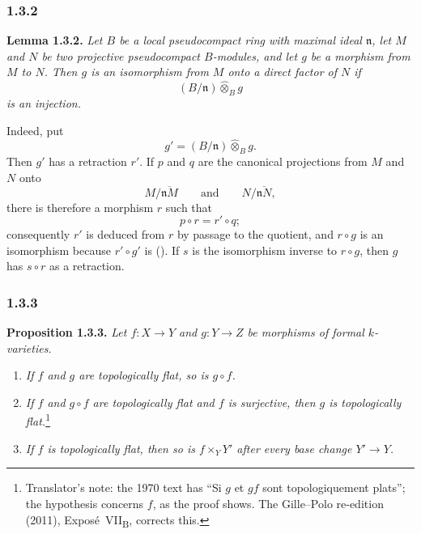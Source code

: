 \subsubsection*{1.3.2}
\label{sga3:VIIB:1.3.2}

\noindent\textbf{Lemma 1.3.2.}
{\itshape Let \(B\) be a local pseudocompact ring with maximal ideal
\(\mathfrak n\), let \(M\) and \(N\) be two projective pseudocompact
\(B\)-modules, and let \(g\) be a morphism from \(M\) to \(N\). Then
\(g\) is an isomorphism from \(M\) onto a direct factor of \(N\) if
\[
  (B/\mathfrak n)\widehat{\otimes}_B g
\]
is an injection.}

Indeed, put
\[
  g'=(B/\mathfrak n)\widehat{\otimes}_B g.
\]
Then \(g'\) has a retraction \(r'\). If \(p\) and \(q\) are the
canonical projections from \(M\) and \(N\) onto
\[
  M/\overline{\mathfrak nM}
  \qquad\text{and}\qquad
  N/\overline{\mathfrak nN},
\]
there is therefore a morphism \(r\) such that
\[
  p\circ r=r'\circ q;
\]
consequently \(r'\) is deduced from \(r\) by passage to the quotient,
and \(r\circ g\) is an isomorphism because \(r'\circ g'\) is
(). If \(s\) is the isomorphism inverse to \(r\circ g\),
then \(g\) has \(s\circ r\) as a retraction.

\subsubsection*{1.3.3}
\label{sga3:VIIB:1.3.3}

\noindent\textbf{Proposition 1.3.3.}
{\itshape Let \(f:X\to Y\) and \(g:Y\to Z\) be morphisms of formal
\(k\)-varieties.}
\begin{enumerate}
  \item[\textup{(i)}]
  {\itshape If \(f\) and \(g\) are topologically flat, so is
  \(g\circ f\).}

  \item[\textup{\SGAInlineRefTarget{sga3:VIIB:1.3.3:item:ii}(ii)}]
  {\itshape If \(f\) and \(g\circ f\) are topologically flat and
  \(f\) is surjective, then \(g\) is topologically flat.}\footnote{Translator's note: the 1970 text has ``Si
  \(g\) et \(gf\) sont topologiquement plats''; the hypothesis concerns \(f\), as the proof shows. The
  Gille--Polo re-edition (2011), Expos\'e~VII\textsubscript{B}, corrects this.}

  \item[\textup{\SGAInlineRefTarget{sga3:VIIB:1.3.3:item:iii}(iii)}]
  {\itshape If \(f\) is topologically flat, then so is
  \(f\times_YY'\) after every base change \(Y'\to Y\).}
\end{enumerate}

